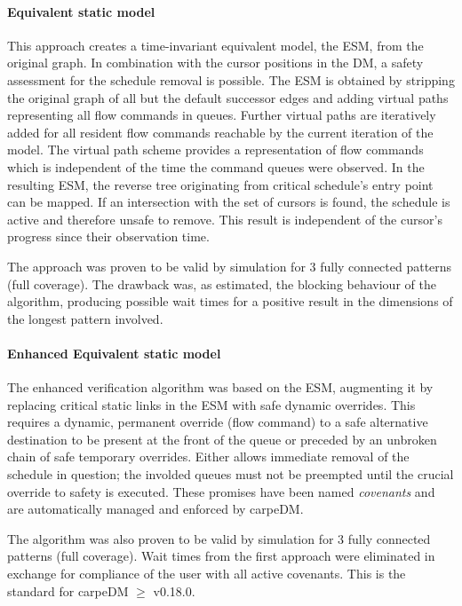 \paragraph{Equivalent static model} This approach creates a time-invariant equivalent model, the ESM, from the original graph. In combination with the cursor positions in the DM, a safety assessment for the schedule removal is possible. The ESM is obtained by stripping the original graph of all but the default successor edges and adding virtual paths representing all flow commands in queues. Further virtual paths are iteratively added for all resident flow commands reachable by the current iteration of the model. The virtual path scheme provides a representation of flow commands which is independent of the time the command queues were observed.
In the resulting ESM, the reverse tree originating from critical schedule's entry point can be mapped. If an intersection with the set of cursors
is found, the schedule is active and therefore unsafe to remove.
This result is independent of the cursor's progress since their observation time.
\par The approach was proven to be valid by simulation for 3 fully  connected patterns (full coverage). The drawback was, as estimated, the blocking behaviour of the algorithm, producing possible wait times for a positive result in the dimensions of the longest pattern involved.
\paragraph{Enhanced Equivalent static model}
The enhanced verification algorithm was based on the ESM, augmenting it by replacing critical static links in the ESM with safe dynamic overrides. This requires a dynamic, permanent override (flow command) to a safe alternative destination to be present at the front of the queue or preceded by an unbroken chain of safe temporary overrides. Either allows immediate removal of the schedule in question; the involded queues must not be preempted until the crucial override to safety is executed. These promises have been named \emph{covenants} and are automatically managed and enforced by carpeDM.
\par The algorithm was also proven to be valid by simulation for 3 fully connected patterns (full coverage). Wait times from the first approach were eliminated in exchange for compliance of the user with all active covenants.
This is the standard for carpeDM $\ge$ v0.18.0.



